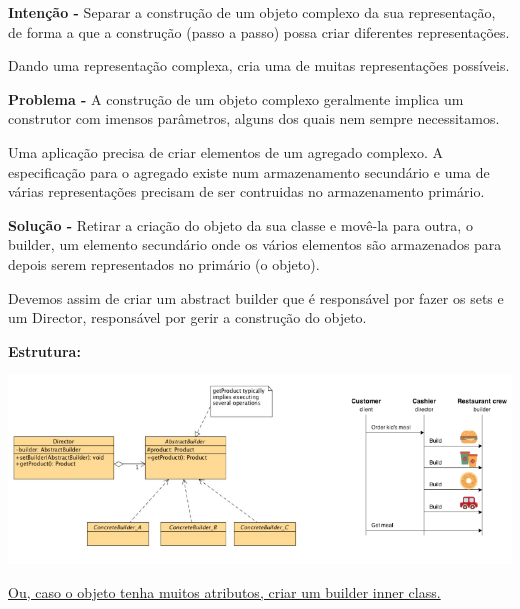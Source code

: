 \documentclass{article}
\begin{document}
\begin{flushleft}
    \textbf{Intenção -} Separar a construção de um objeto complexo da sua representação, de forma a que
    a construção (passo a passo) possa criar diferentes representações.

    Dando uma representação complexa, cria uma de muitas representações possíveis.
\end{flushleft}

\begin{flushleft}
    \textbf{Problema -} A construção de um objeto complexo geralmente implica um construtor com imensos
    parâmetros, alguns dos quais nem sempre necessitamos.
    
    Uma aplicação precisa de criar elementos de um agregado complexo. A
    especificação para o agregado existe num armazenamento secundário e uma de
    várias representações precisam de ser contruidas no armazenamento primário.

\end{flushleft}

\begin{flushleft}
    \textbf{Solução -} Retirar a criação do objeto da sua classe e movê-la para outra, o builder, um
    elemento secundário onde os vários elementos são armazenados para depois serem
    representados no primário (o objeto).

    Devemos assim de criar um abstract builder que é responsável por fazer os sets e
    um Director, responsável por gerir a construção do objeto.  
\end{flushleft}

\begin{flushleft}
    \textbf{Estrutura:}

    \begin{center}
        \includegraphics[scale=0.5]{Images/31.png}
    \end{center}

\uline{Ou, caso o objeto tenha muitos atributos, criar um builder inner class.}

\end{flushleft}
\end{document}
